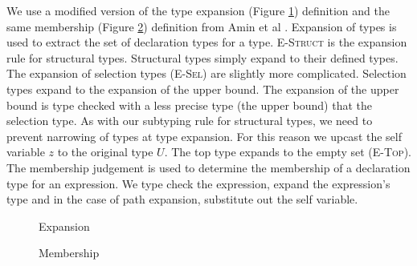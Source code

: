 \documentclass[11pt
              , a4paper
              , twoside
              , openright
              ]{report}
\numberwithin{case}{theorem}
\numberwithin{subcase}{case}
\begin{document}
We use a modified version of the type expansion (Figure \ref{f:exp}) definition and the same membership (Figure \ref{f:mem}) definition from Amin et al \cite{amin:fool:2012, Amin:2014:FPT:2660193.2660216}. Expansion of types is used to extract the set of declaration types for a type. \textsc{E-Struct} is the expansion rule for structural types. Structural types simply expand to their defined types. The expansion of selection types (\textsc{E-Sel}) are slightly more complicated. Selection types expand to the expansion of the upper bound. The expansion of the upper bound is type checked with a less precise type (the upper bound) that the selection type. As with our subtyping rule for structural types, we need to prevent narrowing of types at type expansion. For this reason we upcast the self variable $z$ to the original type $U$. The top type expands to the empty set (\textsc{E-Top}). The membership judgement is used to determine the membership of a declaration type for an expression. We type check the expression, expand the expression's type and in the case of path expansion, substitute out the self variable.

\begin{figure}[t]
\hfill {}
\caption{Expansion}
\label{f:exp}
\end{figure}
\begin{figure}[t]
\hfill {}
\caption{Membership}
\label{f:mem}
\end{figure}
\end{document}
